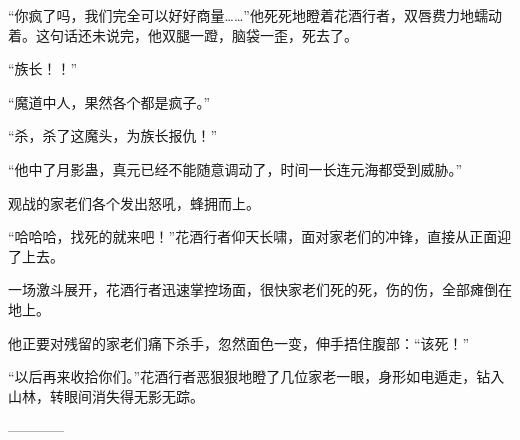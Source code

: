 \begin{this_body}
“你疯了吗，我们完全可以好好商量……”他死死地瞪着花酒行者，双唇费力地蠕动着。这句话还未说完，他双腿一蹬，脑袋一歪，死去了。

“族长！！”

“魔道中人，果然各个都是疯子。”

“杀，杀了这魔头，为族长报仇！”

“他中了月影蛊，真元已经不能随意调动了，时间一长连元海都受到威胁。”

观战的家老们各个发出怒吼，蜂拥而上。

“哈哈哈，找死的就来吧！”花酒行者仰天长啸，面对家老们的冲锋，直接从正面迎了上去。

一场激斗展开，花酒行者迅速掌控场面，很快家老们死的死，伤的伤，全部瘫倒在地上。

他正要对残留的家老们痛下杀手，忽然面色一变，伸手捂住腹部：“该死！”

“以后再来收拾你们。”花酒行者恶狠狠地瞪了几位家老一眼，身形如电遁走，钻入山林，转眼间消失得无影无踪。

------------

\end{this_body}

